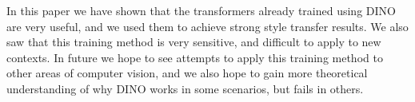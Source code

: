 \documentclass{article}
\begin{document}
In this paper we have shown that the transformers already trained using DINO are very useful, and we used them to achieve strong style transfer results. We also saw that this training method is very sensitive, and difficult to apply to new contexts. In future we hope to see attempts to apply this training method to other areas of computer vision, and we also hope to gain more theoretical understanding of why DINO works in some scenarios, but fails in others. 

\medskip

\nocite{*}


\end{document}
